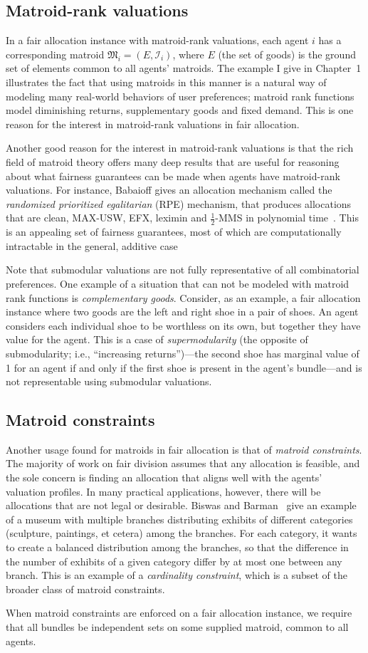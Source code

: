 \subsection{Matroid-rank valuations}
In a fair allocation instance with matroid-rank valuations, each agent $i$ has a corresponding matroid $\mathfrak{M}_i = (E, \mathcal{I}_i)$, where $E$ (the set of goods) is the ground set of elements common to all agents' matroids. The example I give in Chapter~1 illustrates the fact that using matroids in this manner is a natural way of modeling many real-world behaviors of user preferences; matroid rank functions model diminishing returns, supplementary goods and fixed demand. This is one reason for the interest in matroid-rank valuations in fair allocation.

Another good reason for the interest in matroid-rank valuations is that the rich field of matroid theory offers many deep results that are useful for reasoning about what fairness guarantees can be made when agents have matroid-rank valuations. For instance, Babaioff gives an allocation mechanism called the \textit{randomized prioritized egalitarian} (RPE) mechanism, that produces allocations that are clean, MAX-USW, EFX, leximin and $\frac{1}{2}$-MMS in polynomial time~\cite{Babaioff2020FairAT}. This is an appealing set of fairness guarantees, most of which are computationally intractable in the general, additive case

Note that submodular valuations are not fully representative of all combinatorial preferences. One example of a situation that can not be modeled with matroid rank functions is \textit{complementary goods}. Consider, as an example, a fair allocation instance where two goods are the left and right shoe in a pair of shoes. An agent considers each individual shoe to be worthless on its own, but together they have value for the agent. This is a case of \textit{supermodularity} (the opposite of submodularity; i.e., ``increasing returns'')---the second shoe has marginal value of 1 for an agent if and only if the first shoe is present in the agent's bundle---and is not representable using submodular valuations.

\subsection{Matroid constraints}
Another usage found for matroids in fair allocation is that of \textit{matroid constraints}. The majority of work on fair division assumes that any allocation is feasible, and the sole concern is finding an allocation that aligns well with the agents' valuation profiles. In many practical applications, however, there will be allocations that are not legal or desirable. Biswas and Barman~\cite{barman2020fair} give an example of a museum with multiple branches distributing exhibits of different categories (sculpture, paintings, et cetera) among the branches. For each category, it wants to create a balanced distribution among the branches, so that the difference in the number of exhibits of a given category differ by at most one between any branch. This is an example of a \textit{cardinality constraint}, which is a subset of the broader class of matroid constraints. 

When matroid constraints are enforced on a fair allocation instance, we require that all bundles be independent sets on some supplied matroid, common to all agents. 